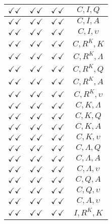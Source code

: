 \documentclass[a4paper,10pt]{article}
\begin{document}
\begin{longtable}{|c|c|c|c|}
$\checkmark\checkmark$ & $\checkmark\checkmark$ & $\checkmark\checkmark$ & ${C},{I},{Q}$ \\
\hline
$\checkmark\checkmark$ & $\checkmark\checkmark$ & $\checkmark\checkmark$ & ${C},{I},{A}$ \\
\hline
$\checkmark\checkmark$ & $\checkmark\checkmark$ & $\checkmark\checkmark$ & ${C},{I},{\upsilon}$ \\
\hline
$\checkmark\checkmark$ & $\checkmark\checkmark$ & $\checkmark\checkmark$ & ${C},{R^{K}},{K}$ \\
\hline
$\checkmark\checkmark$ & $\checkmark\checkmark$ & $\checkmark\checkmark$ & ${C},{R^{K}},{\Lambda}$ \\
\hline
$\checkmark\checkmark$ & $\checkmark\checkmark$ & $\checkmark\checkmark$ & ${C},{R^{K}},{Q}$ \\
\hline
$\checkmark\checkmark$ & $\checkmark\checkmark$ & $\checkmark\checkmark$ & ${C},{R^{K}},{A}$ \\
\hline
$\checkmark\checkmark$ & $\checkmark\checkmark$ & $\checkmark\checkmark$ & ${C},{R^{K}},{\upsilon}$ \\
\hline
$\checkmark\checkmark$ & $\checkmark\checkmark$ & $\checkmark\checkmark$ & ${C},{K},{\Lambda}$ \\
\hline
$\checkmark\checkmark$ & $\checkmark\checkmark$ & $\checkmark\checkmark$ & ${C},{K},{Q}$ \\
\hline
$\checkmark\checkmark$ & $\checkmark\checkmark$ & $\checkmark\checkmark$ & ${C},{K},{A}$ \\
\hline
$\checkmark\checkmark$ & $\checkmark\checkmark$ & $\checkmark\checkmark$ & ${C},{K},{\upsilon}$ \\
\hline
$\checkmark\checkmark$ & $\checkmark\checkmark$ & $\checkmark\checkmark$ & ${C},{\Lambda},{Q}$ \\
\hline
$\checkmark\checkmark$ & $\checkmark\checkmark$ & $\checkmark\checkmark$ & ${C},{\Lambda},{A}$ \\
\hline
$\checkmark\checkmark$ & $\checkmark\checkmark$ & $\checkmark\checkmark$ & ${C},{\Lambda},{\upsilon}$ \\
\hline
$\checkmark\checkmark$ & $\checkmark\checkmark$ & $\checkmark\checkmark$ & ${C},{Q},{A}$ \\
\hline
$\checkmark\checkmark$ & $\checkmark\checkmark$ & $\checkmark\checkmark$ & ${C},{Q},{\upsilon}$ \\
\hline
$\checkmark\checkmark$ & $\checkmark\checkmark$ & $\checkmark\checkmark$ & ${C},{A},{\upsilon}$ \\
\hline
$\checkmark\checkmark$ & $\checkmark\checkmark$ & $\checkmark\checkmark$ & ${I},{R^{K}},{K}$ \\

\end{longtable}
\end{document}

